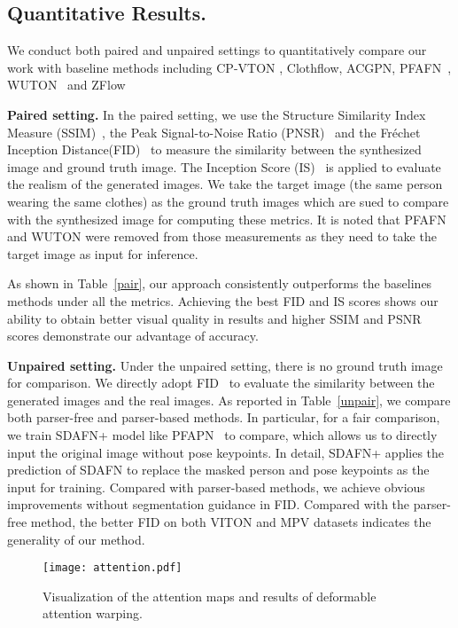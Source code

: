 \documentclass[runningheads]{llncs}
\begin{document}
\subsection{Quantitative Results.} 
We conduct both paired and unpaired settings to quantitatively compare our work with baseline methods including CP-VTON \cite{CPVTON}, Clothflow\cite{han2019clothflow}, ACGPN\cite{AGCPN}, PFAFN~\cite{ge2021parser}, WUTON~\cite{issenhuth2020not} and ZFlow\cite{zflow}

\textbf{Paired setting.} In the paired setting, we use the Structure Similarity Index Measure (SSIM)~\cite{seshadrinathan2008unifying}, the Peak Signal-to-Noise Ratio (PNSR)~\cite{hore2010image} and the Fréchet Inception Distance(FID)~\cite{heusel2017gans} to measure the similarity between the synthesized image and ground truth image. The Inception Score (IS)~\cite{salimans2016improved} is applied to evaluate the realism of the generated images. We take the target image (the same person wearing the same clothes) as the ground truth images which are sued to compare with the synthesized image for computing these metrics. It is noted that PFAFN and WUTON were removed from those measurements as they need to take the target image as input for inference.

As shown in Table~\ref{pair}, our approach consistently outperforms the baselines methods under all the metrics. Achieving the best FID and IS scores shows our ability to obtain better visual quality in results and higher SSIM and PSNR scores demonstrate our advantage of accuracy. 



\textbf{Unpaired setting.} Under the unpaired setting, there is no ground truth image for comparison. We directly adopt FID~\cite{heusel2017gans} to evaluate the similarity between the generated images and the real images. As reported in Table~\ref{unpair}, we compare both parser-free and parser-based methods. In particular, for a fair comparison, we train SDAFN+ model like PFAPN~\cite{ge2021parser} to compare, which allows us to directly input the original image without pose keypoints. In detail, SDAFN+ applies the prediction of SDAFN to replace the masked person and pose keypoints as the input for training. Compared with parser-based methods, we achieve obvious
improvements without segmentation guidance in FID. Compared with the parser-free method, the better FID on both VITON and MPV datasets indicates the generality of our method.


\begin{figure}[t]
\centering
\texttt{[image: attention.pdf]}
   \caption{Visualization of the attention maps and results of deformable attention warping. \label{att}}

\end{figure}
\end{document}
